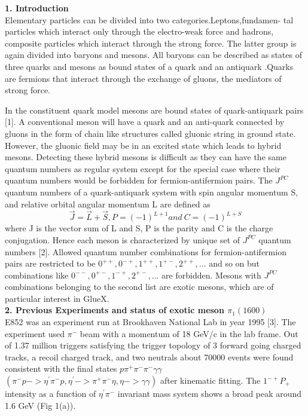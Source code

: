 \documentclass[11pt]{article}
\begin{document}
\textbf {1.	Introduction}\\

Elementary particles can be divided into two categories.Leptons,fundamen-
tal particles which interact only through the electro-weak force and hadrons, composite particles which interact through the strong force. The latter group is again divided into baryons and mesons. All baryons can be described as states of three quarks and mesons as bound states of a quark and an antiquark .Quarks are fermions that interact through the exchange of gluons, the mediators of strong force.

In the constituent quark model mesons are bound states of quark-antiquark  pairs [1].
A conventional meson will have a quark and an anti-quark connected by gluons in the form of chain like structures called gluonic string in ground state. 
However, the gluonic field may be in an excited state which leads to hybrid mesons. Detecting these hybrid mesons is difficult as they can have the same quantum numbers as regular   system except for the special case where their quantum numbers would be forbidden for fermion-antifermion pairs. 
 The $J^{PC}$ quantum numbers of a quark-antiquark system with spin angular momentum S, and relative orbital angular momentum L are defined as $$ \vec{J} = \vec{L} +\vec{ S}, P =(-1) ^{L+1} and \  
   C= (-1) ^{L+S} $$ where J is the vector sum of L and S, P is the parity and C is the charge conjugation.
Hence each meson is characterized by unique set of $J^{PC}$ quantum numbers [2]. Allowed quantum number combinations for fermion-antifermion pairs are restricted  to be $0^{++}, 0^{-+}, 1^{++}, 1^{+-},2^{++}, ...$  and so on but combinations like  $0^{--},0^{+-},1^{-+},2^{+-} ,…$  are forbidden. 
Mesons with $J^{PC}$ combinations belonging to the second list are exotic mesons, which are of particular interest in GlueX.\\

\textbf{2. Previous Experiments and status of exotic meson $\pi_{1 } (1600)$  }\\

E852 was an experiment run at Brookhaven National Lab in year 1995 [3]. 
The experiment used $\pi^{-}$ beam with a momentum of 18 GeV/c in the lab frame.
Out of 1.37 million triggers satisfying the trigger topology of 3 forward going charged tracks, a recoil charged track, and two neutrals about 70000 events were found consistent with the final states $p\pi^{+}\pi^{-}\pi^{-}\gamma\gamma$ $(\pi^{-}p->\eta^{'}\pi^{-}p,\eta^{'}->\pi^{+}\pi^{-}\eta, \eta->\gamma\gamma)$ after kinematic fitting. The $1^{-+}  P_{+}$  intensity as a function of $ \eta^{'}\pi^{-}  $ invariant  mass system shows a broad peak around 1.6 GeV (Fig 1(a)).
\end{document}
